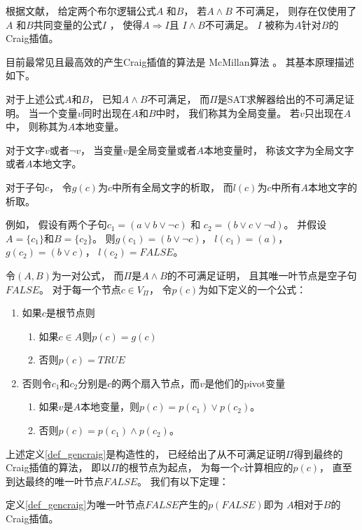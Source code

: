 根据文献，
给定两个布尔逻辑公式$A$ 和$B$，
若$A\wedge B$ 不可满足，
则存在仅使用了$A$ 和$B$共同变量的公式$I$ ，
使得$A\Rightarrow I$且
$I\wedge B$不可满足。
$I$ 被称为$A$针对$B$的Craig插值。

目前最常见且最高效的产生Craig插值的算法是
McMillan算法 。
其基本原理描述如下。

对于上述公式$A$和$B$，
已知$A\wedge B$不可满足，
而$\Pi$是SAT求解器给出的不可满足证明。
当一个变量$v$同时出现在$A$和$B$中时，
我们称其为全局变量。
若$v$只出现在$A$中，
则称其为$A$本地变量。

对于文字$v$或者$\neg v$，
当变量$v$是全局变量或者$A$本地变量时，
称该文字为全局文字或者$A$本地文字。

对于子句$c$，
令$g(c)$为$c$中所有全局文字的析取，
而$l(c)$为$c$中所有$A$本地文字的析取。

例如，
假设有两个子句$c_1=(a\vee b\vee\neg c)$ 和
$c_2=(b\vee c\vee\neg d)$。
并假设$A=\{c_1\}$和$B=\{c_2\}$。
则$g(c_1)=(b\vee\neg c)$，
$l(c_1)=(a)$，
$g(c_2)=(b\vee c)$，
$l(c_2)=FALSE$。


\begin{definition}\label{def_gencraig}
令$(A,B)$为一对公式，
而$\Pi$是$A\wedge B$的不可满足证明，
且其唯一叶节点是空子句$FALSE$。
对于每一个节点$c\in V_{\Pi}$，
令$p(c)$为如下定义的一个公式：
\begin{enumerate}
\item 如果$c$是根节点则
  \begin{enumerate}
    \item 如果$c\in A$则$p(c)=g(c)$
    \item 否则$p(c)=TRUE$
  \end{enumerate}
\item 否则令$c_1$和$c_2$分别是$c$的两个扇入节点，而$v$是他们的pivot变量
  \begin{enumerate}
    \item 如果$v$是$A$本地变量，则$p(c)=p(c_1)\vee p(c_2)$。
    \item 否则$p(c)=p(c_1)\wedge p(c_2)$。
  \end{enumerate}
\end{enumerate}
\end{definition}

上述定义\ref{def_gencraig}是构造性的，
已经给出了从不可满足证明$\Pi$得到最终的Craig插值的算法，
即以$\Pi$的根节点为起点，
为每一个$c$计算相应的$p(c)$，
直至到达最终的唯一叶节点$FALSE$。
我们有以下定理：

\begin{theorem}
定义\ref{def_gencraig}为唯一叶节点$FALSE$产生的$p(FALSE)$即为
$A$相对于$B$的Craig插值。
\end{theorem}

